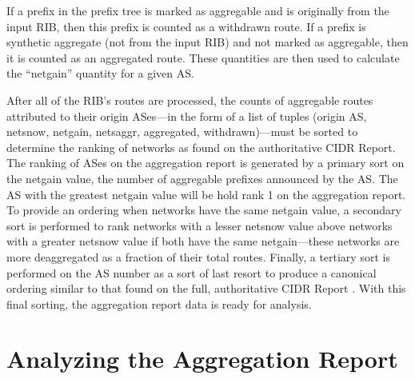 If a prefix in the prefix tree is marked as aggregable and is originally from the input RIB, then this prefix is counted as a withdrawn route. If a prefix is synthetic aggregate (not from the input RIB) and not marked as aggregable, then it is counted as an aggregated route. These quantities are then used to calculate the ``netgain'' quantity for a given AS.

After all of the RIB's routes are processed, the counts of aggregable routes attributed to their origin ASes---in the form of a list of tuples (origin AS, netsnow, netgain, netsaggr, aggregated, withdrawn)---must be sorted to determine the ranking of networks as found on the authoritative CIDR Report. The ranking of ASes on the aggregation report is generated by a primary sort on the netgain value, the number of aggregable prefixes announced by the AS. The AS with the greatest netgain value will be hold rank 1 on the aggregation report. To provide an ordering when networks have the same netgain value, a secondary sort is performed to rank networks with a lesser netsnow value above networks with a greater netsnow value if both have the same netgain---these networks are more deaggregated as a fraction of their total routes. Finally, a tertiary sort is performed on the AS number as a sort of last resort to produce a canonical ordering similar to that found on the full, authoritative CIDR Report \cite{CIDR Report full ranking}. With this final sorting, the aggregation report data is ready for analysis.

\section{Analyzing the Aggregation Report}







